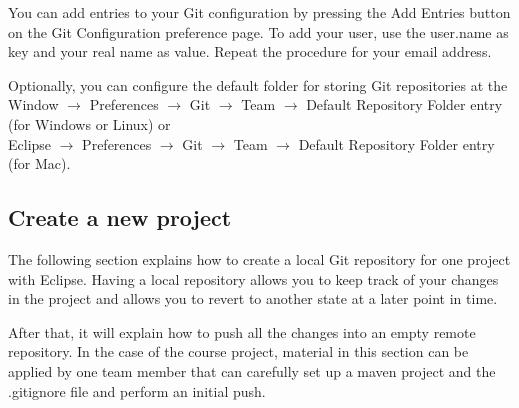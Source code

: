 \documentclass{article}
\newif\ifinstall
\begin{document}
You can add entries to your Git configuration by pressing the Add
Entries button on the Git Configuration preference page. To add your
user, use the user.name as key and your real name as value. Repeat the
procedure for your email address. 

Optionally, you can configure the default folder for storing Git
repositories at the\\ 
Window $\rightarrow$ Preferences $\rightarrow$ Git $\rightarrow$ Team
$\rightarrow$ Default Repository Folder entry (for Windows or Linux) or\\
Eclipse $\rightarrow$ Preferences $\rightarrow$ Git $\rightarrow$ Team
$\rightarrow$ Default  Repository Folder entry (for Mac). 


\ifinstall
\else
\subsection{Create a new project}

The following section explains how to create a local Git repository
for one project with Eclipse. Having a local repository allows you to keep track of your
changes in the project and allows you to revert to another state at a
later point in time.
 
After that, it will explain how to push all the changes into an empty
remote repository. In the case of the course project, material in this
section can be applied by one team member that can carefully set up a
maven project and the .gitignore file and perform an initial push.
\end{document}
